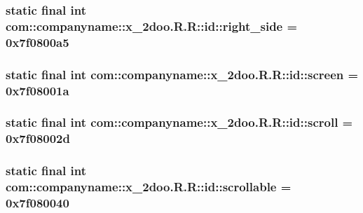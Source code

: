 \hypertarget{classcom_1_1companyname_1_1x__2doo_1_1_r_1_1id_2f0d18a37b935c590d2b2bd38c83d496}{
\subsubsection[{right\_\-side}]{\setlength{\rightskip}{0pt plus 5cm}static final int com::companyname::x\_\-2doo.R.R::id::right\_\-side = 0x7f0800a5}}
\label{classcom_1_1companyname_1_1x__2doo_1_1_r_1_1id_2f0d18a37b935c590d2b2bd38c83d496}


\hypertarget{classcom_1_1companyname_1_1x__2doo_1_1_r_1_1id_7c9ec6ce1f3fd8c16d5fcc2c56081253}{
\subsubsection[{screen}]{\setlength{\rightskip}{0pt plus 5cm}static final int com::companyname::x\_\-2doo.R.R::id::screen = 0x7f08001a}}
\label{classcom_1_1companyname_1_1x__2doo_1_1_r_1_1id_7c9ec6ce1f3fd8c16d5fcc2c56081253}


\hypertarget{classcom_1_1companyname_1_1x__2doo_1_1_r_1_1id_15efb888507df993d263f921a1767335}{
\subsubsection[{scroll}]{\setlength{\rightskip}{0pt plus 5cm}static final int com::companyname::x\_\-2doo.R.R::id::scroll = 0x7f08002d}}
\label{classcom_1_1companyname_1_1x__2doo_1_1_r_1_1id_15efb888507df993d263f921a1767335}


\hypertarget{classcom_1_1companyname_1_1x__2doo_1_1_r_1_1id_f1df6c20518e30d517d3497ac36e4d87}{
\subsubsection[{scrollable}]{\setlength{\rightskip}{0pt plus 5cm}static final int com::companyname::x\_\-2doo.R.R::id::scrollable = 0x7f080040}}
\label{classcom_1_1companyname_1_1x__2doo_1_1_r_1_1id_f1df6c20518e30d517d3497ac36e4d87}



